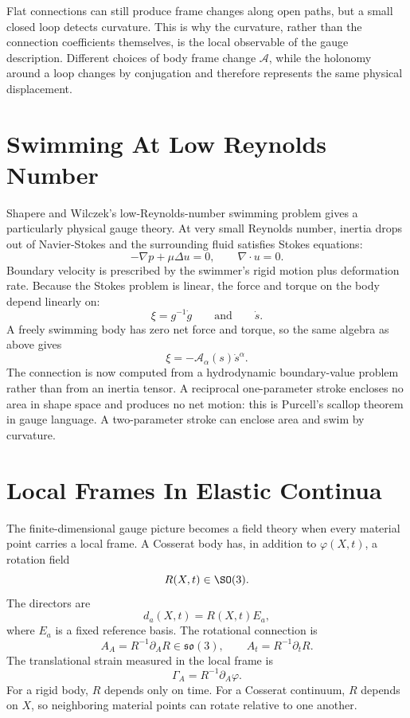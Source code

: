 Flat connections can still produce frame changes along open paths, but a small
closed loop detects curvature. This is why the curvature, rather than the
connection coefficients themselves, is the local observable of the gauge
description. Different choices of body frame change \(\mathcal A\), while the
holonomy around a loop changes by conjugation and therefore represents the same
physical displacement.

\section{Swimming At Low Reynolds Number}
\label{sec:low-reynolds-swimming}

Shapere and Wilczek's low-Reynolds-number swimming problem gives a particularly
physical gauge theory. At very small Reynolds number, inertia drops out of
Navier-Stokes and the surrounding fluid satisfies Stokes equations:
\[
  -\nabla p+\mu\Delta u=0,\qquad \nabla\cdot u=0.
\]
Boundary velocity is prescribed by the swimmer's rigid motion plus deformation
rate. Because the Stokes problem is linear, the force and torque on the body
depend linearly on:
\[
  \xi=g^{-1}\dot g
  \qquad\text{and}\qquad
  \dot s.
\]
A freely swimming body has zero net force and torque, so the same algebra as
above gives
\[
  \xi=-\mathcal A_\alpha(s)\dot s^\alpha.
\]
The connection is now computed from a hydrodynamic boundary-value problem
rather than from an inertia tensor. A reciprocal one-parameter stroke encloses
no area in shape space and produces no net motion: this is Purcell's scallop
theorem in gauge language. A two-parameter stroke can enclose area and swim by
curvature.

\section{Local Frames In Elastic Continua}
\label{sec:local-frames-elastic-continua}

The finite-dimensional gauge picture becomes a field theory when every material
point carries a local frame. A Cosserat body has, in addition to
\(\varphi(X,t)\), a rotation field
\[
  R(X,t)\in\SO(3).
\]
The directors are
\[
  d_a(X,t)=R(X,t)E_a,
\]
where \(E_a\) is a fixed reference basis. The rotational connection is
\[
  A_A=R^{-1}\partial_A R\in\mathfrak{so}(3),
  \qquad
  A_t=R^{-1}\partial_t R.
\]
The translational strain measured in the local frame is
\[
  \Gamma_A=R^{-1}\partial_A\varphi.
\]
For a rigid body, \(R\) depends only on time. For a Cosserat continuum, \(R\)
depends on \(X\), so neighboring material points can rotate relative to one
another.

